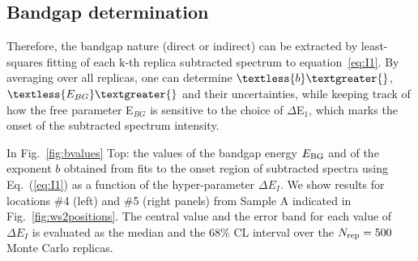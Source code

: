 \subsection{Bandgap determination}

Therefore, the bandgap nature (direct or indirect) can be extracted by 
least-squares fitting of each k-th replica subtracted spectrum to equation~\ref{eq:I1}.
%
By averaging over all replicas, one can determine $\textless{b}\textgreater{}$, 
$\textless{E_{BG}}\textgreater{}$ 
and their uncertainties, while keeping track of how the free parameter
E$_{BG}$ is sensitive to the choice of $\Delta$E$_1$, which marks the onset
of the subtracted spectrum intensity.
%

%

In Fig.~\ref{fig:bvalues} Top: the values of the bandgap energy $E_{\rm BG}$ and of the exponent $b$
  obtained from fits to the onset
  region of subtracted spectra using Eq.~(\ref{eq:I1}) as a function
  of the hyper-parameter $\Delta E_I$.
  We show results for locations \#4 (left)
  and \#5 (right panels) from Sample A indicated in Fig.~\ref{fig:ws2positions}.
  The central value and the error band for each value of $\Delta E_I$ is evaluated
  as the median and the 68\% CL interval over the $N_{\rm rep}=500$ Monte Carlo replicas.

